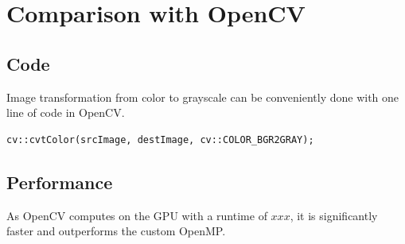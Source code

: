 \section{Comparison with OpenCV}

\subsection{Code}

Image transformation from color to grayscale can be conveniently done with one line of code in OpenCV.

\begin{listing}[H]
    \begin{verbatim}
cv::cvtColor(srcImage, destImage, cv::COLOR_BGR2GRAY);
    \end{verbatim}
    \label{listing:grayscale_opencv}
\end{listing}

\subsection{Performance}

As OpenCV computes on the GPU with a runtime of $ xxx $, it is significantly faster and outperforms the custom OpenMP.